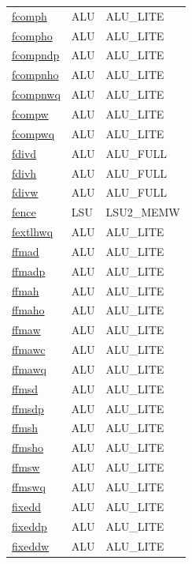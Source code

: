 \begin{small}
\begin{longtable}[l]{l l l}
\hyperlink{lvx.fcomph}{fcomph} & ALU & ALU\_LITE \\ 
\hyperlink{lvx.fcompho}{fcompho} & ALU & ALU\_LITE \\ 
\hyperlink{lvx.fcompndp}{fcompndp} & ALU & ALU\_LITE \\ 
\hyperlink{lvx.fcompnho}{fcompnho} & ALU & ALU\_LITE \\ 
\hyperlink{lvx.fcompnwq}{fcompnwq} & ALU & ALU\_LITE \\ 
\hyperlink{lvx.fcompw}{fcompw} & ALU & ALU\_LITE \\ 
\hyperlink{lvx.fcompwq}{fcompwq} & ALU & ALU\_LITE \\ 
\hyperlink{lvx.fdivd}{fdivd} & ALU & ALU\_FULL \\ 
\hyperlink{lvx.fdivh}{fdivh} & ALU & ALU\_FULL \\ 
\hyperlink{lvx.fdivw}{fdivw} & ALU & ALU\_FULL \\ 
\hyperlink{lvx.fence}{fence} & LSU & LSU2\_MEMW \\ 
\hyperlink{lvx.fextlhwq}{fextlhwq} & ALU & ALU\_LITE \\ 
\hyperlink{lvx.ffmad}{ffmad} & ALU & ALU\_LITE \\ 
\hyperlink{lvx.ffmadp}{ffmadp} & ALU & ALU\_LITE \\ 
\hyperlink{lvx.ffmah}{ffmah} & ALU & ALU\_LITE \\ 
\hyperlink{lvx.ffmaho}{ffmaho} & ALU & ALU\_LITE \\ 
\hyperlink{lvx.ffmaw}{ffmaw} & ALU & ALU\_LITE \\ 
\hyperlink{lvx.ffmawc}{ffmawc} & ALU & ALU\_LITE \\ 
\hyperlink{lvx.ffmawq}{ffmawq} & ALU & ALU\_LITE \\ 
\hyperlink{lvx.ffmsd}{ffmsd} & ALU & ALU\_LITE \\ 
\hyperlink{lvx.ffmsdp}{ffmsdp} & ALU & ALU\_LITE \\ 
\hyperlink{lvx.ffmsh}{ffmsh} & ALU & ALU\_LITE \\ 
\hyperlink{lvx.ffmsho}{ffmsho} & ALU & ALU\_LITE \\ 
\hyperlink{lvx.ffmsw}{ffmsw} & ALU & ALU\_LITE \\ 
\hyperlink{lvx.ffmswq}{ffmswq} & ALU & ALU\_LITE \\ 
\hyperlink{lvx.fixedd}{fixedd} & ALU & ALU\_LITE \\ 
\hyperlink{lvx.fixeddp}{fixeddp} & ALU & ALU\_LITE \\ 
\hyperlink{lvx.fixeddw}{fixeddw} & ALU & ALU\_LITE \\ 

\end{longtable}
\end{small}
